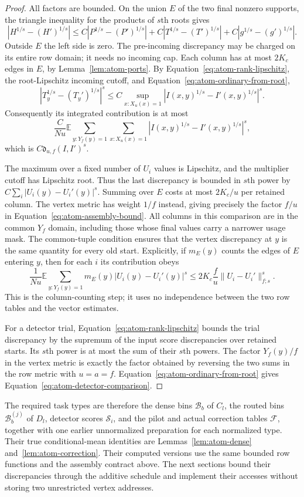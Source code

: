 \begin{proof}
All factors are bounded.  On the union $E$ of the two final nonzero
supports, the triangle inequality for the products of $s$th roots gives
\[
 |H^{1/s}-(H')^{1/s}|
 \le C|P^{1/s}-(P')^{1/s}|
     +C|T^{1/s}-(T')^{1/s}|
     +C|g^{1/s}-(g')^{1/s}|.
\]
Outside $E$ the left side is zero.  The pre-incoming discrepancy may be
charged on its entire row domain; it needs no incoming cap.  Each column
has at most $2K_c$ edges in $E$, by Lemma~\ref{lem:atom-ports}.
By Equation~\eqref{eq:atom-rank-lipschitz}, the root-Lipschitz incoming
cutoff, and Equation~\eqref{eq:atom-ordinary-from-root},
\[
 |T_y^{1/s}-(T_y')^{1/s}|^s
 \le C\sup_{x:X_u(x)=1}
            |I(x,y)^{1/s}-I'(x,y)^{1/s}|^s.
\]
Consequently its integrated contribution is at most
\[
 \frac C{Nu}\mathbb E\sum_{y:Y_f(y)=1}
              \sum_{x:X_u(x)=1}
              |I(x,y)^{1/s}-I'(x,y)^{1/s}|^s,
\]
which is $C\mathfrak d_{u,f}(I,I')^s$.

The maximum over a fixed number of $U_i$ values is Lipschitz, and the
multiplier cutoff has Lipschitz root.  Thus the last discrepancy is
bounded in $s$th power by $C\sum_i|U_i(y)-U_i'(y)|^s$.
Summing over $E$ costs at most $2K_c/u$ per retained column.  The vertex
metric has weight $1/f$ instead, giving precisely the factor $f/u$ in
Equation~\eqref{eq:atom-assembly-bound}.  All columns in this comparison
are in the common $Y_f$ domain, including those whose final values carry
a narrower usage mask.  The common-tuple condition ensures that the
vertex discrepancy at $y$ is the same quantity for every old start.
Explicitly, if $m_E(y)$ counts the edges of $E$ entering $y$, then for
each $i$ its contribution obeys
\[
 \frac1{Nu}\mathbb E\sum_{y:Y_f(y)=1}
       m_E(y)|U_i(y)-U_i'(y)|^s
 \le 2K_c\frac fu\|U_i-U_i'\|_{f;s}^s.
\]
This is the column-counting step; it uses no independence between the
two row tables and the vector estimates.

For a detector trial, Equation~\eqref{eq:atom-rank-lipschitz} bounds the
trial discrepancy by the supremum of the input score discrepancies over
retained starts.  Its $s$th power is at most the sum of their $s$th powers.
The factor $Y_f(y)/f$ in the vertex metric is exactly the factor obtained
by reversing the two sums in the row metric with $u=a=f$.
Equation~\eqref{eq:atom-ordinary-from-root} gives
Equation~\eqref{eq:atom-detector-comparison}.
\end{proof}

The required task types are therefore the dense bins $\mathcal B_b$ of
$C_l$, the routed bins $\mathcal B_b^{(j)}$ of $D_l$, detector scores
$\mathcal S_i$, and the pilot and actual correction tables $\mathcal F$,
together with one earlier unnormalized preparation for each normalized
type.  Their true conditional-mean identities are
Lemmas~\ref{lem:atom-dense} and~\ref{lem:atom-correction}.  Their computed
versions use the same bounded row functions and the assembly contract
above.  The next sections bound their discrepancies through the
additive schedule and implement their accesses without storing two
unrestricted vertex addresses.
